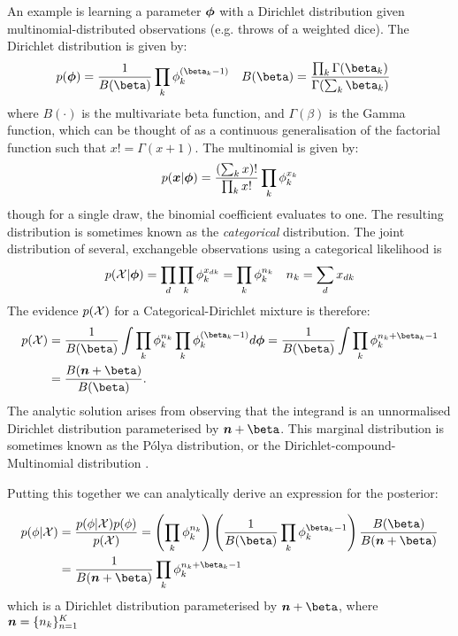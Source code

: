 An example is learning a parameter ${ \bm \phi }$ with a Dirichlet distribution given multinomial-distributed observations (e.g. throws of a weighted dice). The Dirichlet distribution is given by:
\begin{align}
p(\param) & = \oneover{B(\vv{\beta})} \prod_k \phi_k^{(\beta_k - 1)} &
B(\vv{\beta}) & = \frac{\prod_k \Gamma(\beta_k)}{\Gamma(\sum_k \beta_k)}
\end{align}
where $B(\cdot)$ is the multivariate beta function, and $\Gamma(\beta)$ is the Gamma function, which can be thought of as a continuous generalisation of the factorial function such that $x! = \Gamma(x+1)$. The multinomial is given by:
\begin{align}
p(\bm x|{ \bm \phi }) = \frac{(\sum_k x)!}{\prod_k x!} \prod_k \phi_k^{x_k}
\end{align}
though for a single draw, the binomial coefficient evaluates to one. The resulting distribution is sometimes known as the \emph{categorical} distribution. The joint distribution of several, exchangeble observations using a categorical likelihood is
\begin{align}
p({ \mathcal{X} }|{ \bm \phi }) & = \prod_d \prod_k \phi_k^{x_{dk}} = \prod_k \phi_k^{n_k} &
n_k = \sum_d x_{dk}
\end{align}
The evidence $p({ \mathcal{X} })$ for a Categorical-Dirichlet mixture is therefore:
\begin{align}
p(\xdat) & = \frac{1}{B(\beta)} \int \prod_k \phi_k^{n_k} \prod_k \phi_k^{(\beta_k - 1)} d\param  = \frac{1}{B(\beta)} \int \prod_k \phi_k^{n_k + \beta_k - 1} \\
& = \frac{B(\vv{n} + \vv{\beta})}{B(\vv{\beta})}.
\end{align}
The analytic solution arises from observing that the integrand is an unnormalised Dirichlet distribution parameterised by $\vv{n} + \vv{\beta}$. This marginal distribution is sometimes known as the P\'{o}lya distribution, or the Dirichlet-compound-Multinomial distribution \cite{Madsen2005}.\label{polya}

Putting this together we can analytically derive an expression for the posterior:

\begin{align}
\begin{split}
p(\phi|\xdat) 
& = \frac{p(\phi|\xdat)p(\phi)}{p(\xdat)}
 = \left(\prod_k \phi_k^{n_k} \right)
   \left(\oneover{B(\vv{\beta})} \prod_k \phi_k^{\beta_k - 1} \right)
   \frac{B(\vv{\beta})}{B(\vv{n} + \vv{\beta})} \\
& = \oneover{B(\vv{n} + \vv{\beta})} \prod_k \phi_k^{n_k + \beta_k - 1}
\end{split}
\end{align}
which is a Dirichlet distribution parameterised by $\vv{n} + \vv{\beta}$, where $\bm n = \{ n_k \}_{n=1}^K$

